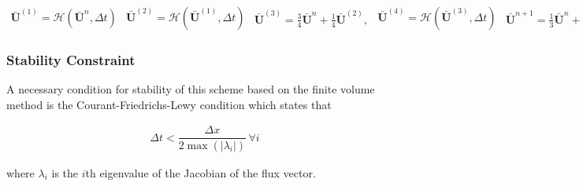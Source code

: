 \documentclass[SingleSpace,12pt]{Serre_ASCE}
\begin{document}
\begin{linenomath*}
\begin{subequations}
\begin{gather}\label{eq:SSPRK31}
\boldsymbol{\bar{U}}^{\left(1\right)} = \mathcal{H}\left(\boldsymbol{\bar{U}}^{n},\Delta t\right)
\end{gather}
\begin{gather}\label{eq:SSPRK32}
\boldsymbol{\bar{U}}^{\left(2\right)} = \mathcal{H}\left(\boldsymbol{\bar{U}}^{\left(1\right)},\Delta t\right)
\end{gather}
\begin{gather}\label{eq:SSPRK33}
\boldsymbol{\bar{U}}^{\left(3\right)}= \frac{3}{4}\boldsymbol{\bar{U}}^{n} + \frac{1}{4}\boldsymbol{\bar{U}}^{\left(2\right)} ,
\end{gather}
\begin{gather}\label{eq:SSPRK34}
\boldsymbol{\bar{U}}^{\left(4\right)} = \mathcal{H}\left(\boldsymbol{\bar{U}}^{\left(3\right)},\Delta t\right)
\end{gather}
\begin{gather}\label{eq:SSPRK35}
\boldsymbol{\bar{U}}^{n+1}= \frac{1}{3}\boldsymbol{\bar{U}}^{n} + \frac{2}{3}\boldsymbol{\bar{U}}^{\left(4\right)}.
\end{gather}
\end{subequations}
\label{eq:SSPRK3}
\end{linenomath*}
\subsubsection{Stability Constraint} %
A necessary condition for stability of this scheme based on the finite volume method is the Courant-Friedrichs-Lewy condition \cite{LeVeque-2002} which states that
\begin{linenomath*}
\begin{gather}
\Delta t < \dfrac{\Delta x}{2 \max\left(\left|\lambda_i\right|\right)} \, \forall i
\end{gather}
\end{linenomath*}
where $\lambda_i$ is the $i$th eigenvalue of the Jacobian of the flux vector. 
\end{document}
